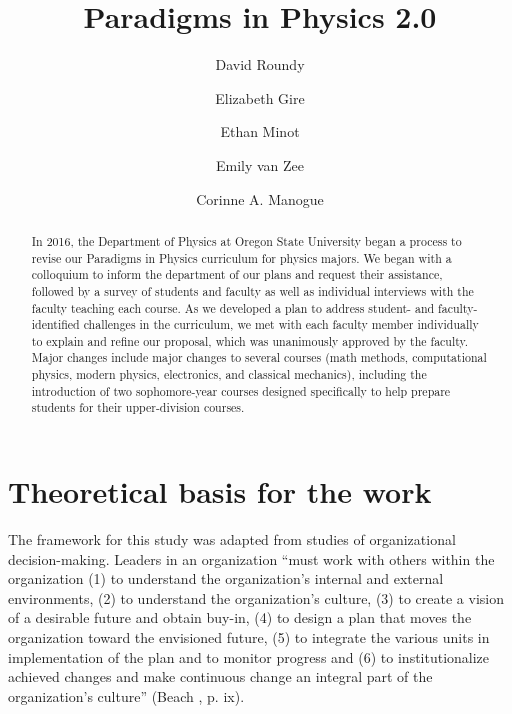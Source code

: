 \documentclass[aps,prstper,reprint]{revtex4-1}
\begin{document}
\title{Paradigms in Physics 2.0}
\author{David Roundy}
\author{Elizabeth Gire}
\author{Ethan Minot}
\author{Emily van Zee}
\author{Corinne A. Manogue}


\begin{abstract}
In 2016, the Department of Physics at Oregon State University began a
process to revise our Paradigms in Physics curriculum for physics
majors.  We began with a colloquium to inform the department of our
plans and request their assistance, followed by a
survey of students and faculty as well as individual interviews with
the faculty teaching each course.  As we developed a plan to
address student- and faculty-identified challenges in the curriculum,
we met with each faculty member individually to explain and refine our
proposal, which was unanimously approved by the faculty.  Major
changes include major changes to several courses (math
methods, computational physics, modern physics, electronics, and
classical mechanics), including the introduction of two sophomore-year
courses designed specifically to help prepare students for their
upper-division courses.
\end{abstract}

\maketitle

\section{Theoretical basis for the work}
The framework for this study was adapted from studies of
organizational decision-making\cite{beach2006leadership}. Leaders in
an organization ``must work with others within the organization (1) to
understand the organization's internal and external environments, (2)
to understand the organization's culture, (3) to create a vision of a
desirable future and obtain buy-in, (4) to design a plan that moves
the organization toward the envisioned future, (5) to integrate the
various units in implementation of the plan and to monitor progress
and (6) to institutionalize achieved changes and make continuous
change an integral part of the organization's culture'' (Beach ,
p. ix).  \cite{beach2006leadership}
\end{document}
